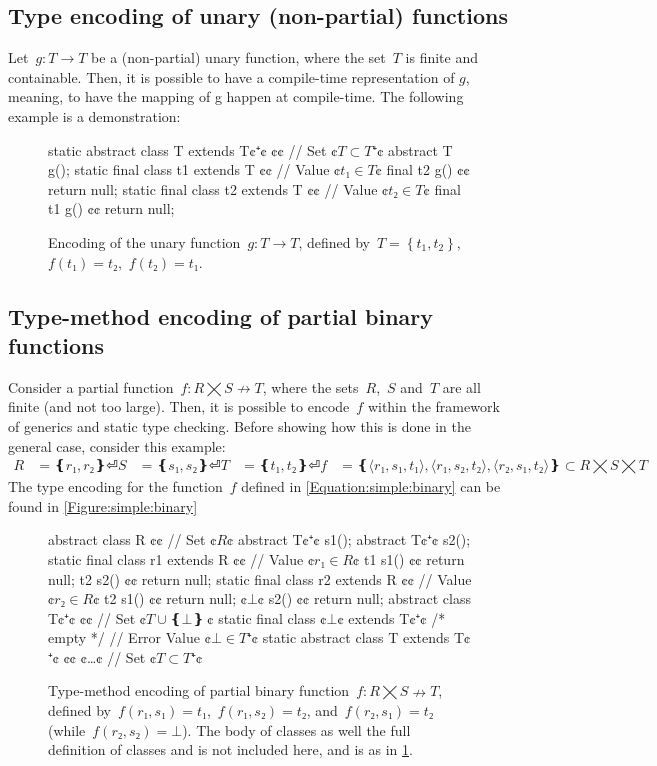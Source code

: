 \subsection{Type encoding of unary (non-partial) functions}
Let~$g: T \rightarrow T $ be a (non-partial) unary function,
  where the set~$T$ is finite and containable.
Then, it is possible to have a compile-time representation of $g$,
  meaning, to have the mapping of g happen at compile-time.
The following example is a demonstration:
\begin{figure}
  \begin{JAVA}[style=numbered]
static abstract class T extends T¢$⁺$¢ {¢¢ // Set ¢$T⊂T⁺$¢
  abstract T g();
}
static final class t1 extends T {¢¢ // Value ¢$t₁∈T$¢
  final t2 g() {¢¢ return null; }
}
static final class t2 extends T {¢¢ // Value ¢$t₂∈T$¢
  final t1 g() {¢¢ return null; }
}
\end{JAVA}
  \caption{Encoding of the unary function~$g: T→T$,
  defined by~$T=\left\{ t_1,t_2 \right\}$,~$f(t₁)=t₂$,~$f(t₂)=t₁$.}
  \label{Figure:unary:function}
\end{figure}

\subsection{Type-method encoding of partial binary functions}
Consider a partial function~$f: R⨉S↛T$,
  where the sets~$R$,~$S$ and~$T$ are all finite (and not too large).
Then, it is possible to encode~$f$
  within the framework of \Java generics and static type checking.
Before showing how this is done in the general case, consider this example:
\begin{equation}
  \label{Equation:simple:binary}
\begin{split}
  R & = ❴ r₁, r₂❵⏎
  S & = ❴ s₁, s₂❵⏎
  T & = ❴ t₁, t₂❵⏎
  f & = ❴ ⟨r₁, s₁, t₁⟩, ⟨r₁, s₂, t₂⟩, ⟨r₂, s₁, t₂⟩ ❵ ⊂R⨉S⨉T
\end{split}
\end{equation}
The \Java type encoding for the function~$f$ defined in \cref{Equation:simple:binary}
  can be found in \cref{Figure:simple:binary}

\begin{figure}
  \begin{JAVA}[style=numbered]
abstract class R {¢¢ // Set ¢$R$¢
  abstract T¢$⁺$¢ s1();
  abstract T¢$⁺$¢ s2();
  static final class r1 extends R {¢¢ // Value ¢$r₁∈R$¢
    t1 s1() {¢¢ return null; }
    t2 s2() {¢¢ return null; }
  }
  static final class r2 extends R {¢¢ // Value ¢$r₂∈R$¢
    t2 s1() {¢¢ return null; }
    ¢$⊥$¢ s2() {¢¢ return null; }
  }
}
abstract class T¢$⁺$¢ {¢¢ // Set ¢$T∪❴⊥❵~$¢
  static final class ¢$⊥$¢ extends T¢$⁺$¢ { /* empty */ } // Error Value ¢$⊥∈T⁺$¢
  static abstract class T extends T¢$⁺$¢ {¢¢ ¢…¢ } // Set ¢$T⊂T⁺$¢
}
\end{JAVA}
  \caption{Type-method encoding of partial binary function~$f: R⨉S↛T$,
  defined by~$f(r₁,s₁)=t₁$,~$f(r₁,s₂)=t₂$, and~$f(r₂,s₁)=t₂$ (while~$f(r₂, s₂) =⊥$).
  The body of classes  as well the full definition of classes  and  is not included here, and is
    as in \cref{Figure:unary:function}.}
\end{figure}

